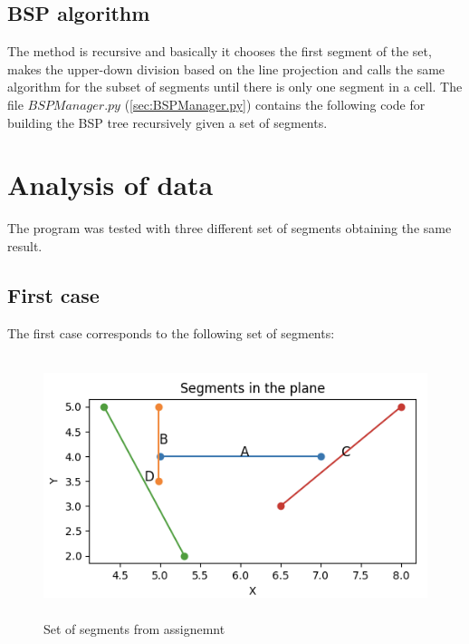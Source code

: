 \documentclass{article}
\begin{document}



\subsection{BSP algorithm}

The method is recursive and basically it chooses the first segment of the set, makes the upper-down division based on the line projection and calls the same algorithm for the subset of segments until there is only one segment in a cell. 
The file $BSPManager.py$ ({\ref{sec:BSPManager.py}}) contains the following code for building the BSP tree recursively given a set of segments. 



\section{Analysis of data}

The program was tested with three different set of segments obtaining the same result.

\subsection{First case}\label{sec:first_case}
The first case corresponds to the following set of segments:

\begin{figure}[H]
	\centering
	\includegraphics[height=3in]{Figure1.png}
	\caption {Set of segments from assignemnt}
	\label{fig:firstcasefig1}
\end{figure}
\end{document}
